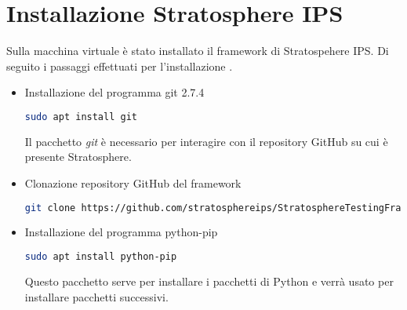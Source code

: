 \documentclass[../main.tex]{subfiles}
\begin{document}
\section{Installazione Stratosphere IPS}
Sulla macchina virtuale è stato installato il framework di Stratospehere IPS. Di seguito i passaggi effettuati per l'installazione \cite{stf}.
\begin{itemize}
				\item Installazione del programma git 2.7.4 \cite{gitdef}
\begin{lstlisting}[language=bash]
 sudo apt install git
\end{lstlisting}
								Il pacchetto \textit{git} è necessario per interagire con il repository GitHub su cui è presente Stratosphere.
				\item Clonazione repository GitHub del framework
\begin{lstlisting}[language=bash]
 git clone https://github.com/stratosphereips/StratosphereTestingFramework
\end{lstlisting}
				\item Installazione del programma python-pip \cite{pipdef}
\begin{lstlisting}[language=bash]
 sudo apt install python-pip
\end{lstlisting}
Questo pacchetto serve per installare i pacchetti di Python e verrà usato per installare pacchetti successivi.
\end{itemize}
\end{document}
